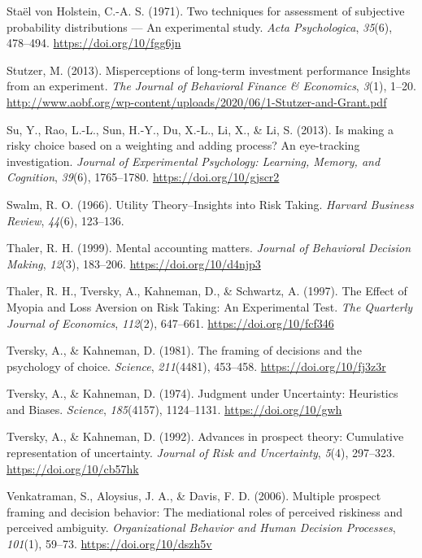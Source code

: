 \documentclass[
  english,
  man, donotrepeattitle,floatsintext]{apa7}
\newlength{\cslhangindent}
\newenvironment{cslreferences}%
  {\setlength{\parindent}{0pt}%
  \everypar{\setlength{\hangindent}{\cslhangindent}}\ignorespaces}%
  {\par}
\theoremstyle{definition}
\theoremstyle{definition}
\theoremstyle{definition}
\theoremstyle{definition}
\theoremstyle{remark}
\begin{document}
\begin{cslreferences}
\leavevmode\hypertarget{ref-staelvonholstein1971}{}%
Staël von Holstein, C.-A. S. (1971). Two techniques for assessment of subjective probability distributions --- An experimental study. \emph{Acta Psychologica}, \emph{35}(6), 478--494. \url{https://doi.org/10/fgg6jn}

\leavevmode\hypertarget{ref-stutzer2013}{}%
Stutzer, M. (2013). Misperceptions of long-term investment performance Insights from an experiment. \emph{The Journal of Behavioral Finance \& Economics}, \emph{3}(1), 1--20. \url{http://www.aobf.org/wp-content/uploads/2020/06/1-Stutzer-and-Grant.pdf}

\leavevmode\hypertarget{ref-su2013}{}%
Su, Y., Rao, L.-L., Sun, H.-Y., Du, X.-L., Li, X., \& Li, S. (2013). Is making a risky choice based on a weighting and adding process? An eye-tracking investigation. \emph{Journal of Experimental Psychology: Learning, Memory, and Cognition}, \emph{39}(6), 1765--1780. \url{https://doi.org/10/gjscr2}

\leavevmode\hypertarget{ref-swalm1966}{}%
Swalm, R. O. (1966). Utility Theory--Insights into Risk Taking. \emph{Harvard Business Review}, \emph{44}(6), 123--136.

\leavevmode\hypertarget{ref-thaler1999}{}%
Thaler, R. H. (1999). Mental accounting matters. \emph{Journal of Behavioral Decision Making}, \emph{12}(3), 183--206. \url{https://doi.org/10/d4njp3}

\leavevmode\hypertarget{ref-thaler1997}{}%
Thaler, R. H., Tversky, A., Kahneman, D., \& Schwartz, A. (1997). The Effect of Myopia and Loss Aversion on Risk Taking: An Experimental Test. \emph{The Quarterly Journal of Economics}, \emph{112}(2), 647--661. \url{https://doi.org/10/fcf346}

\leavevmode\hypertarget{ref-tversky1981}{}%
Tversky, A., \& Kahneman, D. (1981). The framing of decisions and the psychology of choice. \emph{Science}, \emph{211}(4481), 453--458. \url{https://doi.org/10/fj3z3r}

\leavevmode\hypertarget{ref-tversky1974}{}%
Tversky, A., \& Kahneman, D. (1974). Judgment under Uncertainty: Heuristics and Biases. \emph{Science}, \emph{185}(4157), 1124--1131. \url{https://doi.org/10/gwh}

\leavevmode\hypertarget{ref-tversky1992}{}%
Tversky, A., \& Kahneman, D. (1992). Advances in prospect theory: Cumulative representation of uncertainty. \emph{Journal of Risk and Uncertainty}, \emph{5}(4), 297--323. \url{https://doi.org/10/cb57hk}

\leavevmode\hypertarget{ref-venkatraman2006}{}%
Venkatraman, S., Aloysius, J. A., \& Davis, F. D. (2006). Multiple prospect framing and decision behavior: The mediational roles of perceived riskiness and perceived ambiguity. \emph{Organizational Behavior and Human Decision Processes}, \emph{101}(1), 59--73. \url{https://doi.org/10/dszh5v}


\end{cslreferences}
\end{document}
